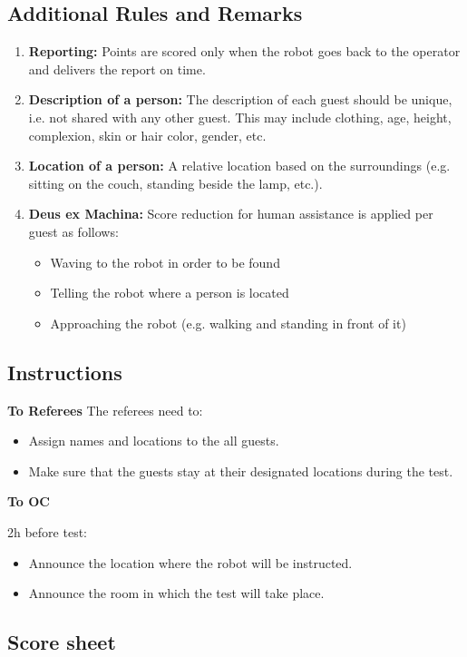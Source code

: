 \subsection*{Additional Rules and Remarks}
\begin{enumerate}[nosep]
	\item \textbf{Reporting:} Points are scored only when the robot goes back to the operator and delivers the report on time.

	\item \textbf{Description of a person:} The description of each guest should be unique, i.e. not shared with any other guest. This may include clothing, age, height, complexion, skin or hair color, gender, etc.

	\item \textbf{Location of a person:} A relative location based on the surroundings (e.g. sitting on the couch, standing beside the lamp, etc.).

	\item \textbf{Deus ex Machina:} Score reduction for human assistance is applied per guest as follows:

		\begin{itemize}
		    \item Waving to the robot in order to be found
			\item Telling the robot where a person is located
			\item Approaching the robot (e.g. walking and standing in front of it)
		\end{itemize}

\end{enumerate}

\subsection*{Instructions}

\textbf{To Referees}
The referees need to:
\begin{itemize}
	\item Assign names and locations to the all guests.
	\item Make sure that the guests stay at their designated locations during the test.
\end{itemize}

\textbf{To OC}

2h before test:
\begin{itemize}
	\item Announce the location where the robot will be instructed.
	\item Announce the room in which the test will take place.
\end{itemize}

\subsection*{Score sheet}


